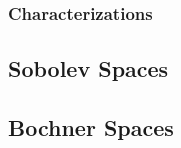\subsubsection{Characterizations}


\newpage
\subsection{Sobolev Spaces}


\newpage
\subsection{Bochner Spaces}

